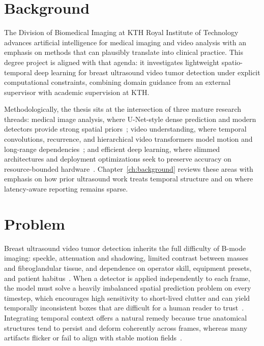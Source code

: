\documentclass[
english,                 %
bibtex,                  %
]{kththesis}
\numberwithin{listing}{chapter}
\begin{document}
\section{Background}
\label{sec:background}

The Division of Biomedical Imaging at KTH Royal Institute of Technology advances artificial intelligence for medical imaging and video analysis with an emphasis on methods that can plausibly translate into clinical practice.
This degree project is aligned with that agenda: it investigates lightweight spatio-temporal deep learning for breast ultrasound video tumor detection under explicit computational constraints, combining domain guidance from an external supervisor with academic supervision at KTH.

Methodologically, the thesis sits at the intersection of three mature research threads: medical image analysis, where U-Net-style dense prediction and modern detectors provide strong spatial priors~\cite{litjens2017_survey_deep_medical,ronneberger2015_unet,lin2017_focal_loss_retinanet}; video understanding, where temporal convolutions, recurrence, and hierarchical video transformers model motion and long-range dependencies~\cite{feichtenhofer2019_slowfast,bertasius2021_spacetime_attention,liu2022_video_swin_transformer}; and efficient deep learning, where slimmed architectures and deployment optimizations seek to preserve accuracy on resource-bounded hardware~\cite{liu2023_edgemednet}.
Chapter~\ref{ch:background} reviews these areas with emphasis on how prior ultrasound work treats temporal structure and on where latency-aware reporting remains sparse.

\section{Problem}
\label{sec:problem}

Breast ultrasound video tumor detection inherits the full difficulty of B-mode imaging: speckle, attenuation and shadowing, limited contrast between masses and fibroglandular tissue, and dependence on operator skill, equipment presets, and patient habitus~\cite{dan2024_breast_us_dl_review,wang2021_ultrasound_dl_review,chen2021_ceus_domain}.
When a detector is applied independently to each frame, the model must solve a heavily imbalanced spatial prediction problem on every timestep, which encourages high sensitivity to short-lived clutter and can yield temporally inconsistent boxes that are difficult for a human reader to trust~\cite{lin2017_focal_loss_retinanet,lin2022_buv_miccai}.
Integrating temporal context offers a natural remedy because true anatomical structures tend to persist and deform coherently across frames, whereas many artifacts flicker or fail to align with stable motion fields~\cite{zhao2023_dynamic_us_video,zhang2024_whbus_isbi}.
\end{document}
